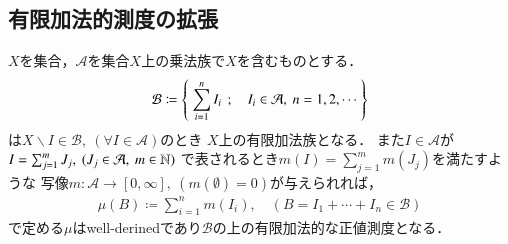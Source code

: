 	\subsection{有限加法的測度の拡張}
		\begin{screen}
			\begin{thm}[有限加法的な正値測度空間の生成]\label{thm:forming_finitely_additive_class}
				$X$を集合，$\mathcal{A}$を集合$X$上の乗法族で$X$を含むものとする．
				\begin{align}
					\mathcal{B} \coloneqq \left\{\ \sum_{i=1}^n I_i\ \, ; \quad I_i \in \mathcal{A},\ n=1,2,\cdots\ \right\}
				\end{align}
				は$X\backslash I \in \mathcal{B},\ (\forall I \in \mathcal{A})$のとき
				$X$上の有限加法族となる．
				また$I \in \mathcal{A}$が$I = \sum_{j=1}^m J_j,\ (J_j \in \mathcal{A},\ m \in \mathbb{N})$
				で表されるとき$m(I) = \sum_{j=1}^m m(J_j)$を満たすような
				写像$m:\mathcal{A} \longrightarrow [0,\infty],\ (m(\emptyset)=0)$が与えられれば，
				\begin{align}
					\mu(B) \coloneqq \sum_{i=1}^n m(I_i),
					\quad (B=I_1 + \cdots + I_n \in \mathcal{B})
				\end{align}
				で定める$\mu$はwell-derinedであり$\mathcal{B}$の上の有限加法的な正値測度となる．
			\end{thm}
		\end{screen}
		
